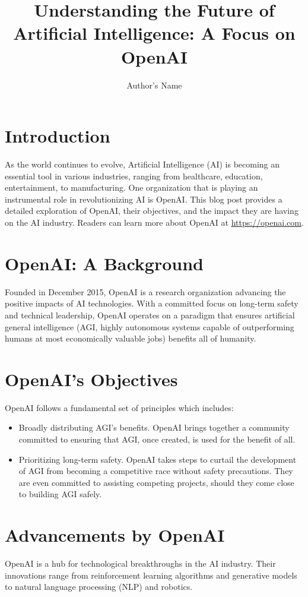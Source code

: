 \documentclass{article}
\begin{document}
\title{Understanding the Future of Artificial Intelligence: A Focus on OpenAI}
\author{Author's Name}
\maketitle

\section{Introduction}
As the world continues to evolve, Artificial Intelligence (AI) is becoming an essential tool in various industries, ranging from healthcare, education, entertainment, to manufacturing. One organization that is playing an instrumental role in revolutionizing AI is OpenAI. This blog post provides a detailed exploration of OpenAI, their objectives, and the impact they are having on the AI industry. Readers can learn more about OpenAI at \href{https://openai.com}{https://openai.com}. 

\section{OpenAI: A Background}
Founded in December 2015, OpenAI is a research organization advancing the positive impacts of AI technologies. With a committed focus on long-term safety and technical leadership, OpenAI operates on a paradigm that ensures artificial general intelligence (AGI, highly autonomous systems capable of outperforming humans at most economically valuable jobs) benefits all of humanity. 

\section{OpenAI's Objectives}
OpenAI follows a fundamental set of principles which includes:
\begin{itemize}
\item Broadly distributing AGI's benefits. OpenAI brings together a community committed to ensuring that AGI, once created, is used for the benefit of all. 
\item Prioritizing long-term safety. OpenAI takes steps to curtail the development of AGI from becoming a competitive race without safety precautions. They are even committed to assisting competing projects, should they come close to building AGI safely.

\end{itemize}

\section{Advancements by OpenAI}
OpenAI is a hub for technological breakthroughs in the AI industry. Their innovations range from reinforcement learning algorithms and generative models to natural language processing (NLP) and robotics.
 
\end{document}
